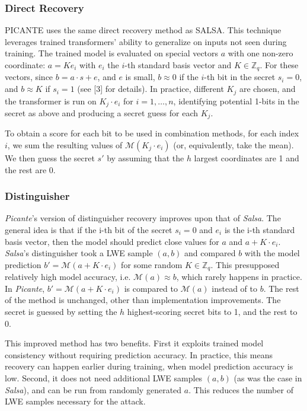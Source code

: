 \documentclass{article}
\begin{document}
\subsubsection{Direct Recovery}
PICANTE uses the same direct recovery method as SALSA. This technique leverages trained transformers’ ability to generalize on inputs not seen during training. The trained model is evaluated on special vectors \(a\) with one non-zero coordinate: \(a = K e_i\) with \(e_i\) the \(i\)-th standard basis vector and \(K \in \mathbb{Z}_q\). For these vectors, since \(b = a \cdot s + e\), and \(e\) is small, \(b \approx 0\) if the \(i\)-th bit in the secret \(s_i = 0\), and \(b \approx K\) if \(s_i = 1\) (see [3] for details). In practice, different \(K_j\) are chosen, and the transformer is run on \(K_j \cdot e_i\) for \(i = 1, \ldots, n\), identifying potential 1-bits in the secret as above and producing a secret guess for each \(K_j\).

To obtain a score for each bit to be used in combination methods, for each index \(i\), we sum the resulting values of \(\mathcal{M}(K_j \cdot e_i)\) (or, equivalently, take the mean). We then guess the secret \(s'\) by assuming that the \(h\) largest coordinates are 1 and the rest are 0.

\subsubsection{Distinguisher}
\textit{Picante}'s version of distinguisher recovery improves upon that of \textit{Salsa}. The general idea is that if the i-th bit of the secret \( s_i = 0 \) and \( e_i \) is the i-th standard basis vector, then the model should predict close values for \( a \) and \( a + K \cdot e_i \). \textit{Salsa}'s distinguisher took a LWE sample \( (a, b) \) and compared \( b \) with the model prediction \( b' = \mathcal{M}(a + K \cdot e_i) \) for some random \( K \in \mathbb{Z}_q \). This presupposed relatively high model accuracy, i.e. \( \mathcal{M}(a) \approx b \), which rarely happens in practice. In \textit{Picante}, \( b' = \mathcal{M}(a + K \cdot e_i) \) is compared to \( \mathcal{M}(a) \) instead of to \( b \). The rest of the method is unchanged, other than implementation improvements. The secret is guessed by setting the \( h \) highest-scoring secret bits to 1, and the rest to 0.

This improved method has two benefits. First it exploits trained model consistency without requiring prediction accuracy. In practice, this means recovery can happen earlier during training, when model prediction accuracy is low. Second, it does not need additional LWE samples \( (a, b) \) (as was the case in \textit{Salsa}), and can be run from randomly generated \( a \). This reduces the number of LWE samples necessary for the attack.
\end{document}
